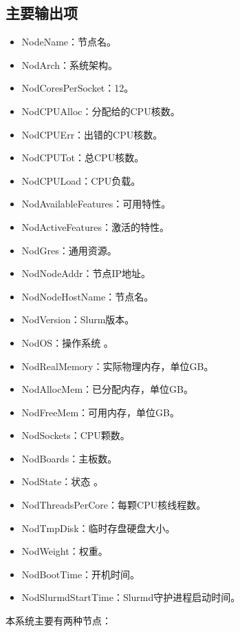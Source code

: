 \subsection{主要输出项}
\begin{itemize}
	\item NodeName：节点名。
	\item NodArch：系统架构。
	\item NodCoresPerSocket：12。
	\item NodCPUAlloc：分配给的CPU核数。
	\item NodCPUErr：出错的CPU核数。
	\item NodCPUTot：总CPU核数。
	\item NodCPULoad：CPU负载。
	\item NodAvailableFeatures：可用特性。
	\item NodActiveFeatures：激活的特性。
	\item NodGres：通用资源。
	\item NodNodeAddr：节点IP地址。
	\item NodNodeHostName：节点名。
	\item NodVersion：Slurm版本。
	\item NodOS：操作系统 。
	\item NodRealMemory：实际物理内存，单位GB。
	\item NodAllocMem：已分配内存，单位GB。
	\item NodFreeMem：可用内存，单位GB。
	\item NodSockets：CPU颗数。
	\item NodBoards：主板数。
	\item NodState：状态 。
	\item NodThreadsPerCore：每颗CPU核线程数。
	\item NodTmpDisk：临时存盘硬盘大小。
	\item NodWeight：权重。
	\item NodBootTime：开机时间。
	\item NodSlurmdStartTime：Slurmd守护进程启动时间。
\end{itemize}
本系统主要有两种节点：
